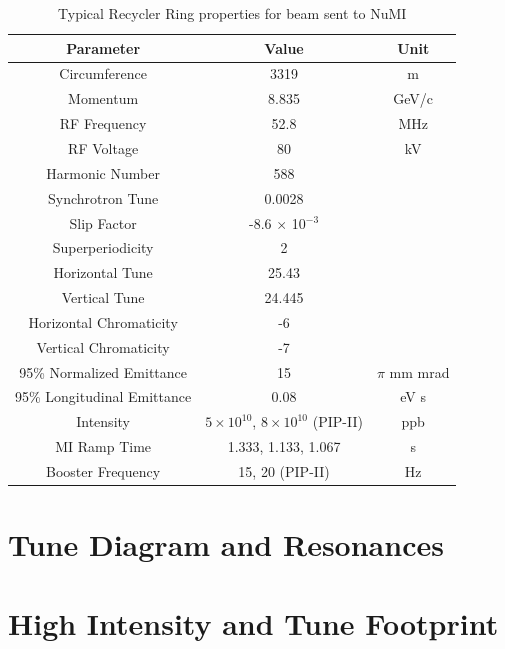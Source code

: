 \begin{table}[]
\centering
\caption{Typical Recycler Ring properties for beam sent to NuMI}
\label{tab:rrparams}
\begin{tabular}{@{}ccc@{}}
\toprule
\textbf{Parameter}          & \textbf{Value}                             & \textbf{Unit} \\ \midrule
Circumference               & 3319                                       & m             \\
Momentum                    & 8.835                                      & GeV/c         \\
RF Frequency                & 52.8                                       & MHz           \\
RF Voltage                  & 80                                         & kV            \\
Harmonic Number             & 588                                        &               \\
Synchrotron Tune            & 0.0028                                     &               \\
Slip Factor                 & -8.6 $\times$ 10$^{-3}$                    &               \\
Superperiodicity            & 2                                          &               \\
Horizontal Tune             & 25.43                                      &               \\
Vertical Tune               & 24.445                                     &               \\
Horizontal Chromaticity     & -6                                         &               \\
Vertical Chromaticity       & -7                                         &               \\
95\% Normalized Emittance   & 15                                         & $\pi$ mm mrad \\
95\% Longitudinal Emittance & 0.08                                       & eV s          \\
Intensity                   & $5\times10^{10}$, $8\times10^{10}$ (PIP-II) & ppb           \\
MI Ramp Time                & 1.333, 1.133, 1.067                        & s             \\
Booster Frequency           & 15, 20 (PIP-II)                            & Hz            \\ \bottomrule
\end{tabular}
\end{table}

\section{Tune Diagram and Resonances}

\section{High Intensity and Tune Footprint}

